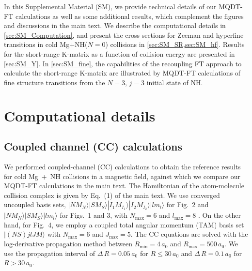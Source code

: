 \documentclass[reprint,amssymb,noeprint,twocolumn,longbibliography]{revtex4-2}
\begin{document}
\maketitle



\tableofcontents 


\vspace{0.8cm}
In this Supplemental Material (SM), we provide technical details of our MQDT-FT calculations as well as some additional results, which complement the figures and discussions in the main text. We describe the computational details in \cref{sec:SM_Computation}, and present the cross sections for Zeeman and hyperfine transitions in cold Mg+NH($N=0$) collisions   in \cref{sec:SM_SR,sec:SM_hf}. 
Results for the short-range K-matrix as a function of collision energy are presented in \cref{sec:SM_Y}. 
In \cref{sec:SM_fine}, the capabilities of the recoupling FT approach to calculate the short-range K-matrix are illustrated by MQDT-FT calculations of fine structure transitions from the $N=3$, $j=3$  initial state of NH. 



\setcounter{equation}{0}
\setcounter{figure}{0}



\vspace{0.5cm}
\section{\label{sec:SM_Computation} Computational details}

\subsection{Coupled channel (CC) calculations}

We performed coupled-channel (CC) calculations to obtain the reference results for cold Mg~+~NH collisions  in a magnetic field, against which we compare our MQDT-FT calculations in the main text.  
The Hamiltonian of the atom-molecule collision complex is given by Eq.~(1) of the main text.
We use converged uncoupled basis sets, $|NM_N\rangle|SM_S\rangle|I_{1} M_{I_1}\rangle|I_{2}M_{I_2}\rangle|lm_l\rangle$ for Fig.~2 and $|NM_N\rangle|SM_S\rangle|lm_l\rangle$ for Figs.~1 and 3, with $N_\text{max}=6$ and $l_\text{max}=8$ \cite{Wallis_09}. 
On the other hand, for Fig.~4, we employ a coupled total angular momentum (TAM) basis set $|(NS)jlJM\rangle$ with $N_\text{max}=6$ and $J_\text{max}=5$.
The CC equations are solved with the log-derivative propagation method \cite{Johnson_73} between $R_\text{min}= 4\,a_0$ and $R_\text{max}= 500\,a_0$. We use the propagation interval of $\Delta\,R= 0.05\,a_0$ for $R\leq30\,a_0$ and $\Delta\,R=0.1\,a_0$ for $R>30\,a_0$. 
\end{document}
